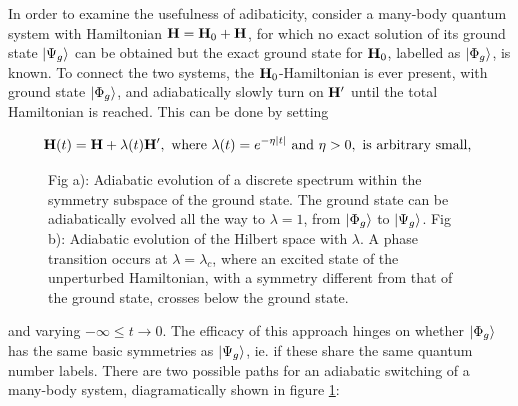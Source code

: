In order to examine the usefulness of adibaticity, consider a many-body quantum system with Hamiltonian ${\bf H} = {\bf H}_0 + {\bf H}$, for which no exact solution of its ground state $\ket{\Psi_g}$ can be obtained but the exact ground state for ${\bf H}_0$, labelled as $\ket{\Phi_g}$, is known. To connect the two systems, the ${\bf H}_0$-Hamiltonian is ever present, with ground state $\ket{\Phi_g}$, and adiabatically slowly turn on ${\bf H}'$ until the total Hamiltonian is reached. This can be done by setting 

\begin{equation}
    {\bf H}(t) = {\bf H} + \lambda(t) {\bf H}', \textnormal{ where } \lambda(t) = e^{-\eta |t|} \textnormal{ and } \eta > 0, \textnormal{ is arbitrary small, }
    \label{Adiabatic_switching_on}
\end{equation}

\begin{figure}
    \centering
    \qquad
    \caption{\small  Fig a): Adiabatic evolution of a discrete spectrum within the symmetry subspace of the ground state. The ground state can be adiabatically evolved all the way to $\lambda = 1$, from $\ket{\Phi_g}$ to $\ket{\Psi_g}$. Fig b): Adiabatic evolution of the Hilbert space with $\lambda$. A phase transition occurs at $\lambda = \lambda_c$, where an excited state of the unperturbed Hamiltonian, with a symmetry different from that of the ground state, crosses below the ground state. } 
    \label{figs:adiabatic_evols}
\end{figure}

and varying $-\infty \leq t \rightarrow 0$. The efficacy of this approach hinges on whether $\ket{\Phi_g}$ has the same basic symmetries as $\ket{\Psi_g}$, ie. if these share the same quantum number labels. There are two possible paths for an adiabatic switching of a many-body system, diagramatically shown in figure \cref{figs:adiabatic_evols}:

